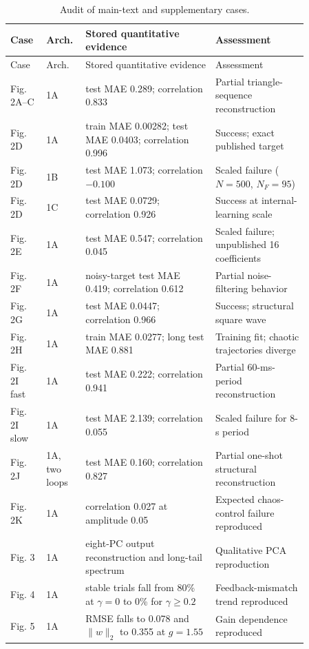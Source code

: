{\small
\setlength{\tabcolsep}{4pt}
\begin{longtable}{@{}p{0.10\linewidth}p{0.08\linewidth}p{0.39\linewidth}p{0.29\linewidth}@{}}
\caption{Audit of main-text and supplementary cases.\label{tab:audit}}\\
\toprule
Case & Arch. & Stored quantitative evidence & Assessment \\
\midrule
\endfirsthead
\toprule
Case & Arch. & Stored quantitative evidence & Assessment \\
\midrule
\endhead
Fig. 2A--C & 1A & test MAE 0.289; correlation 0.833 & Partial triangle-sequence reconstruction \\
Fig. 2D & 1A & train MAE 0.00282; test MAE 0.0403; correlation 0.996 & Success; exact published target \\
Fig. 2D & 1B & test MAE 1.073; correlation $-0.100$ & Scaled failure ($N=500$, $N_F=95$) \\
Fig. 2D & 1C & test MAE 0.0729; correlation 0.926 & Success at internal-learning scale \\
Fig. 2E & 1A & test MAE 0.547; correlation 0.045 & Scaled failure; unpublished 16 coefficients \\
Fig. 2F & 1A & noisy-target test MAE 0.419; correlation 0.612 & Partial noise-filtering behavior \\
Fig. 2G & 1A & test MAE 0.0447; correlation 0.966 & Success; structural square wave \\
Fig. 2H & 1A & train MAE 0.0277; long test MAE 0.881 & Training fit; chaotic trajectories diverge \\
Fig. 2I fast & 1A & test MAE 0.222; correlation 0.941 & Partial 60-ms-period reconstruction \\
Fig. 2I slow & 1A & test MAE 2.139; correlation 0.055 & Scaled failure for 8-s period \\
Fig. 2J & 1A, two loops & test MAE 0.160; correlation 0.827 & Partial one-shot structural reconstruction \\
Fig. 2K & 1A & correlation 0.027 at amplitude 0.05 & Expected chaos-control failure reproduced \\
Fig. 3 & 1A & eight-PC output reconstruction and long-tail spectrum & Qualitative PCA reproduction \\
Fig. 4 & 1A & stable trials fall from 80\% at $\gamma=0$ to 0\% for $\gamma\ge0.2$ & Feedback-mismatch trend reproduced \\
Fig. 5 & 1A & RMSE falls to 0.078 and $\|w\|_2$ to 0.355 at $g=1.55$ & Gain dependence reproduced \\

\end{longtable}}

